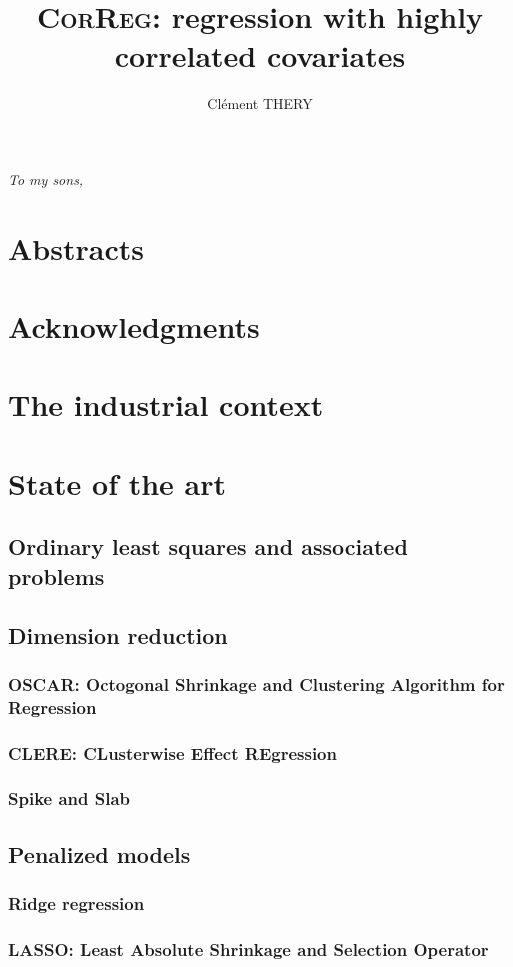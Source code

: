 \documentclass[11pt,a4paper]{report}
\author{Clément THERY}
\title{\textsc{CorReg}: regression with highly correlated covariates}
\begin{document}
\maketitle
\newpage
\itshape To my sons, \upshape
\tableofcontents
\chapter{Abstracts}
\chapter{Acknowledgments}
\chapter{The industrial context}
\chapter{State of the art}
	\section{Ordinary least squares and associated problems}
	\section{Dimension reduction}
		\subsection{OSCAR: Octogonal Shrinkage and Clustering Algorithm for Regression }
			\cite{bondell2008simultaneous}%
		\subsection{CLERE: CLusterwise Effect REgression}
			\cite{yengo2012variable}%
		\subsection{Spike and Slab}	
			\cite{ishwaran2005spike}%
	\section{Penalized models}
		\subsection{Ridge regression}
			\cite{hoerl1970ridge}
			\cite{marquardt1975ridge}
		\subsection{LASSO: Least Absolute Shrinkage and Selection Operator }
			\cite{tibshiranilasso}  
			\cite{tibshirani1996regression} 
			\cite{efron2004least} %
			\cite{Zhao2006MSC}%
			\cite{SAM10088}%
\end{document}
